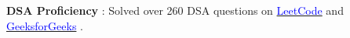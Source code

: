 


\begin{zitemize}
    \item {\textbf{DSA Proficiency }} : Solved over 260 DSA questions on \href{https://leetcode.com/u/mrsamirr/}{\textcolor{blue}{LeetCode}} and \href{https://www.geeksforgeeks.org/user/mrsamirr/}{\textcolor{blue}{GeeksforGeeks}} .
    \end{zitemize}